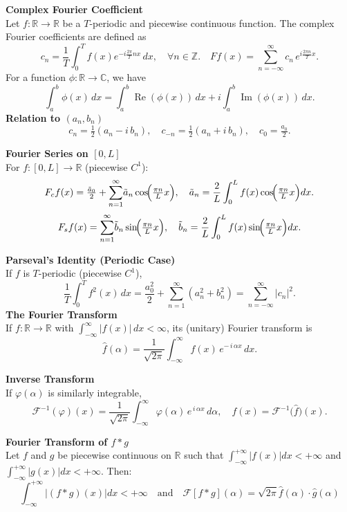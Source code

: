 \documentclass[8pt]{article}
\begin{document}
\begin{multicols}{2}
    \noindent \textbf{Complex Fourier Coefficient}\\
    Let \( f : \mathbb{R} \to \mathbb{R} \) be a \( T \)-periodic and piecewise continuous function. The complex Fourier coefficients are defined as
    \[
    c_n = \frac{1}{T} \int_0^T f(x) e^{-i \frac{2\pi}{T} n x} \, dx, \quad \forall n \in \mathbb{Z}. \quad
    Ff(x) = \sum_{n=-\infty}^{\infty} c_{n}\,e^{i\frac{2\pi n}{T}x}.
    \]
    For a function \( \phi : \mathbb{R} \to \mathbb{C} \), we have
    \[
    \int_a^b \phi(x) \, dx = \int_a^b \operatorname{Re}(\phi(x)) \, dx + i \int_a^b \operatorname{Im}(\phi(x)) \, dx.
    \]
    \noindent \textbf{Relation to \( (a_n, b_n) \)}\\
    \[
    c_{n} = \tfrac{1}{2}(a_{n} - i\,b_{n}), \quad
    c_{-n} = \tfrac{1}{2}(a_{n} + i\,b_{n}), \quad
    c_{0} = \tfrac{a_{0}}{2}.
    \]

    \noindent \textbf{Fourier Series on $[0,L]$}\\
    For $f:[0,L]\to \mathbb{R}$ (piecewise $C^1$):
    \[
    F_{c}f(x)=\tfrac{\tilde a_{0}}{2} + \sum_{n=1}^{\infty}\!\tilde a_{n}\cos\!\Bigl(\tfrac{\pi n}{L}x\Bigr),
    \quad \tilde a_{n}=\frac{2}{L}\int_{0}^{L} f(x)\cos\!\Bigl(\tfrac{\pi n}{L}x\Bigr)dx.
    \]
    \[
    F_{s}f(x)=\sum_{n=1}^{\infty}\!\tilde b_{n}\sin\!\Bigl(\tfrac{\pi n}{L}x\Bigr),
    \quad \tilde b_{n}=\frac{2}{L}\int_{0}^{L} f(x)\sin\!\Bigl(\tfrac{\pi n}{L}x\Bigr)dx.
    \]

    \noindent \textbf{Parseval's Identity (Periodic Case)}\\
    If $f$ is $T$-periodic (piecewise $C^1$),
    \[
    \frac{1}{T}\int_{0}^{T} f^{2}(x)\,dx
    = \frac{a_{0}^{2}}{2} + \sum_{n=1}^{\infty}(a_{n}^{2}+b_{n}^{2})
    = \sum_{n=-\infty}^{\infty}\!\!\bigl|c_{n}\bigr|^{2}.
    \]
    \noindent \textbf{The Fourier Transform}\\
    If $f:\mathbb{R}\to\mathbb{R}$ with $\int_{-\infty}^{\infty}\!|f(x)|\,dx<\infty$, its (unitary) Fourier transform is
    \[
    \widehat{f}(\alpha)=\frac{1}{\sqrt{2\pi}} \int_{-\infty}^{\infty} f(x)\, e^{-\,i\,\alpha x}\,dx.
    \]

    \noindent \textbf{Inverse Transform}\\
    If $\varphi(\alpha)$ is similarly integrable,
    \[
    \mathcal{F}^{-1}(\varphi)(x)= \frac{1}{\sqrt{2\pi}}
    \int_{-\infty}^{\infty}\!\varphi(\alpha)\,e^{\,i\,\alpha x}\,d\alpha,\quad
    f(x)=\mathcal{F}^{-1}\!\bigl(\widehat{f}\bigr)(x).
    \]


    \noindent \textbf{Fourier Transform of \(f * g\)}\\
    Let \(f\) and \(g\) be piecewise continuous on \(\mathbb{R}\) such that \(\int_{-\infty}^{+\infty} |f(x)| dx < +\infty\) and \(\int_{-\infty}^{+\infty} |g(x)| dx < +\infty\). Then:
    \[
    \int_{-\infty}^{+\infty} |(f * g)(x)| dx < +\infty \quad \text{and} \quad \mathcal{F}[f * g](\alpha) = \sqrt{2\pi} \hat{f}(\alpha) \cdot \hat{g}(\alpha)
    \]
    \end{multicols}
\end{document}
